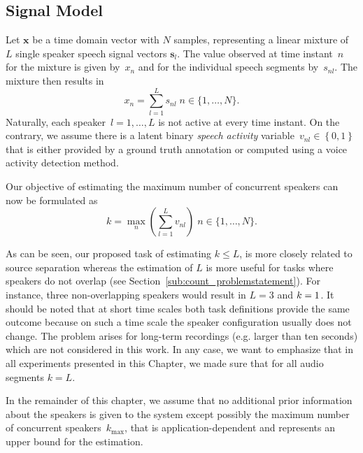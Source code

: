 \subsection{Signal Model}%
\label{ssec:signal_model}
Let \(\mathbf{x}\) be a time domain vector with \(N\) samples, representing a linear mixture of \(L\) single speaker speech signal vectors \(\mathbf{s}_l\).
The value observed at time instant~\(n\) for the mixture is given by~$x_n$ and for the individual speech segments by~$s_{nl}$.
The mixture then results in
%
\begin{equation}
  x_n = \sum_{l=1}^{L}{s_{nl}} \;  n \in \{ 1,\ldots, N \}.
  \label{eq:mixing_model}
\end{equation}
%
Naturally, each speaker~$l=1,\dots,L$ is not active at every time instant.
On the contrary, we assume there is a latent binary \textit{speech activity} variable~$v_{nl}\in \left\{ 0,1 \right\}$ that is either provided by a ground truth annotation or computed using a voice activity detection method.

Our objective of estimating the maximum number of concurrent speakers can now be formulated as
%
\begin{equation}
k=\underset{n}{\max}\left(\sum_{l = 1}^{L} v_{nl}\right) \; n \in \{ 1,\ldots, N \}
\label{eq:definition_k}.
\end{equation}

As can be seen, our proposed task of estimating $k\leq L$, is more closely related to source separation whereas the estimation of \(L\) is more useful for tasks where speakers do not overlap (see Section~\ref{sub:count_problemstatement}).
For instance, three non-overlapping speakers would result in \(L = 3\) and \(k = 1\).
It should be noted that at short time scales both task definitions provide the same outcome because on such a time scale the speaker configuration usually does not change. The problem arises for long-term recordings (e.g. larger than ten seconds) which are not considered in this work.
In any case, we want to emphasize that in all experiments presented in this Chapter, we made sure that for all audio segments $k = L$.
\par
In the remainder of this chapter, we assume that no additional prior information about the speakers is given to the system except possibly the maximum number of concurrent speakers~$k_{\max}$, that is application-dependent and represents an upper bound for the estimation.

